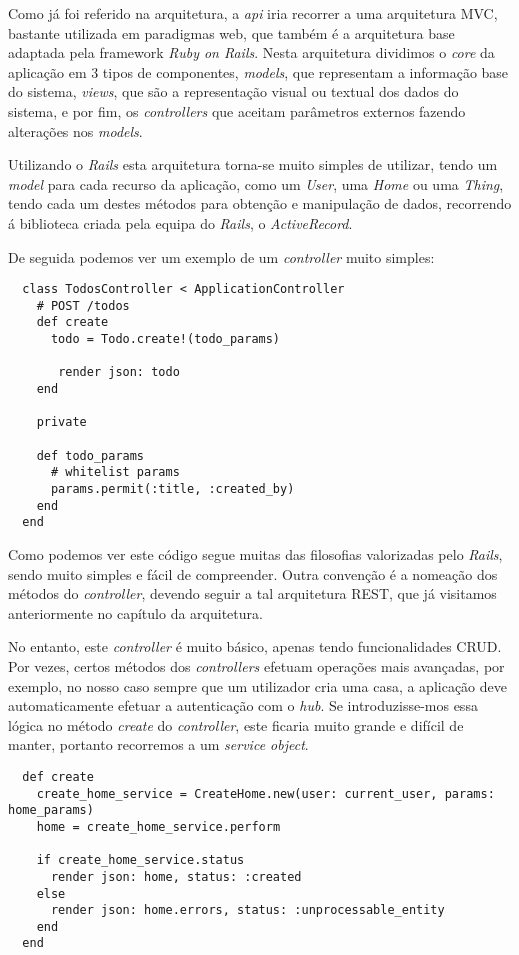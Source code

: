 Como já foi referido na arquitetura, a \textit{api} iria recorrer a uma arquitetura MVC, bastante utilizada em paradigmas web, que também é a arquitetura base adaptada pela framework \textit{Ruby on Rails}. Nesta arquitetura dividimos o \textit{core} da aplicação em 3 tipos de componentes, \textit{models}, que representam a informação base do sistema, \textit{views}, que são a representação visual ou textual dos dados do sistema, e por fim, os \textit{controllers} que aceitam parâmetros externos fazendo alterações nos \textit{models}.

Utilizando o \textit{Rails} esta arquitetura torna-se muito simples de utilizar, tendo um \textit{model} para cada recurso da aplicação, como um \textit{User}, uma \textit{Home} ou uma \textit{Thing}, tendo cada um destes métodos para obtenção e manipulação de dados, recorrendo á biblioteca criada pela equipa do \textit{Rails}, o \textit{ActiveRecord}.

De seguida podemos ver um exemplo de um \textit{controller} muito simples:

\begin{verbatim}
  class TodosController < ApplicationController
    # POST /todos
    def create
      todo = Todo.create!(todo_params)
        
       render json: todo
    end
    
    private
    
    def todo_params
      # whitelist params
      params.permit(:title, :created_by)
    end
  end
\end{verbatim}

Como podemos ver este código segue muitas das filosofias valorizadas pelo \textit{Rails}, sendo muito simples e fácil de compreender. Outra convenção é a nomeação dos métodos do \textit{controller}, devendo seguir a tal arquitetura REST, que já visitamos anteriormente no capítulo da arquitetura.

No entanto, este \textit{controller} é muito básico, apenas tendo funcionalidades CRUD. Por vezes, certos métodos dos \textit{controllers} efetuam operações mais avançadas, por exemplo, no nosso caso sempre que um utilizador cria uma casa, a aplicação deve automaticamente efetuar a autenticação com o \textit{hub}. Se introduzisse-mos essa lógica no método \textit{create} do \textit{controller}, este ficaria muito grande e difícil de manter, portanto recorremos a um \textit{service object}.

\begin{verbatim}
  def create
    create_home_service = CreateHome.new(user: current_user, params: home_params)
    home = create_home_service.perform

    if create_home_service.status
      render json: home, status: :created
    else
      render json: home.errors, status: :unprocessable_entity
    end
  end
\end{verbatim}

